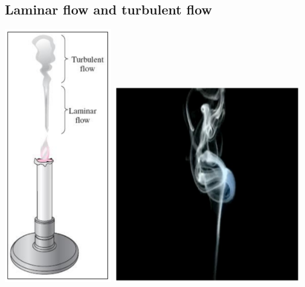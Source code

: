 \documentclass[11pt]{article}
\begin{document}
\subsection{Laminar flow and turbulent flow}
\label{sec:org637c4b0}
\begin{center}
\includegraphics[height=30em]{./images/laminar-and-turbulent-flow-candle-diagram.png}
\includegraphics[width=0.61\textwidth]{./images/laminar-and-turbulent-flow-candle-photo.png}
\end{center}

 \newpage
\end{document}
